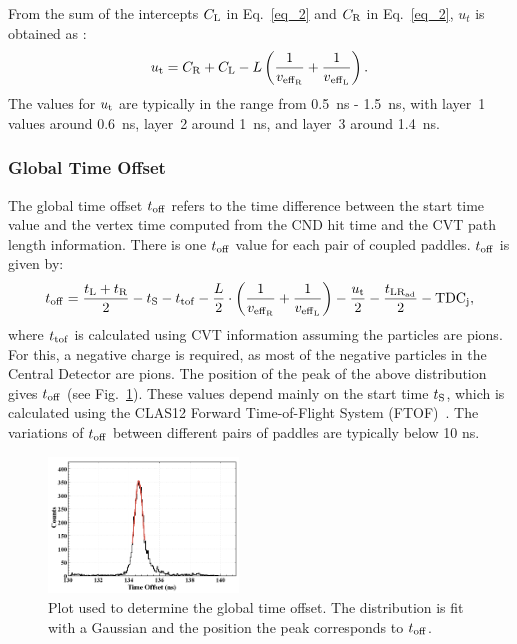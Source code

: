 From the sum of the intercepts $C_{\rm{L}}$ in Eq.~\ref{eq_2} and $C_{\rm{R}}$ in Eq.~\ref{eq_2}, $u_t$ is obtained as :
\begin{equation}
u_{\rm{t}}=C_{\rm{R}}+C_{\rm{L}}-L \left(\frac{1}{v_{\rm{eff}_{\rm{R}}}}+\frac{1}{v{_{\rm{eff}_{\rm{L}}}}}\right).
\end{equation}
The values for $u_{\rm{t}}$ are typically in the range from 0.5~ns - 1.5~ns, with layer~1 values around 0.6~ns, layer~2 around 1~ns, and layer~3 around 1.4~ns.

\subsubsection{Global Time Offset}

The global time offset $t_{\rm{off}}$ refers to the time difference between the start time value and the vertex time computed from the CND hit time and the CVT path length information. There is one $t_{\rm off}$ value for each pair of coupled paddles.
$t_{\rm{off}}$ is given by:
\begin{equation}
t_{\rm{off}} = \frac{t_{\rm{L}}+t_{\rm{R}}}{2} - t_{\rm{S}} - t_{\rm{tof}}
                    - \frac{L}{2} \cdot \left(\frac{1}{v_{\rm{eff}_{\rm{R}}}} + \frac{1}{v_{\rm{eff}_L}}\right) - \frac{u_{\rm{t}}}{2} - \frac{t_{\rm{LR}_{\rm{ad}}}}{2}-{\rm{TDC}}_{\rm{j}},
\end{equation}
where $t_{\rm{tof}}$ is calculated using CVT information assuming the particles are pions. For this, a negative charge is required, as most of the negative particles in the Central Detector are pions. The position of the peak of the above distribution gives $t_{\rm{off}}$ (see Fig.~\ref{toff}). These values depend mainly on the start time $t_{\rm{S}}$, which is calculated using the CLAS12 Forward Time-of-Flight System (FTOF)~\cite{ftof-nim}. The variations of $t_{\rm{off}}$ between different pairs of paddles are typically below 10 ns.

\begin{figure}[htb]
\begin{center}
\includegraphics[width=0.45\textwidth]{Figure/timeoff.png} 
\end{center}
\caption{Plot used to determine the global time offset. The distribution is fit with a Gaussian and the position the peak corresponds to $t_{\rm{off}}$.}
\label{toff}
\end{figure}

